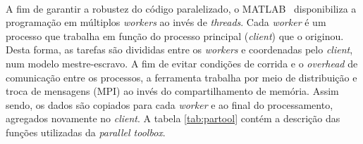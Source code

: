 \documentclass[
    12pt,               %
    openright,          %
    oneside,
    a4paper,            %
    english,            %
    french,             %
    spanish,            %
    brazil              %
    ]{abntex2}
\newcommand{\matlab}{MATLAB\textsuperscript{\textregistered} \ }
\begin{document}
A fim de garantir a robustez do código paralelizado, o \matlab disponibiliza a programação em múltiplos \textit{workers} ao invés de \textit{threads}. Cada \textit{worker} é um processo que trabalha em função do processo principal (\textit{client}) que o originou. Desta forma, as tarefas são divididas entre os \textit{workers} e coordenadas pelo \textit{client}, num modelo mestre-escravo. A fim de evitar condições de corrida e o \textit{overhead} de comunicação entre os processos, a ferramenta trabalha por meio de distribuição e troca de mensagens (MPI) ao invés do compartilhamento de memória. Assim sendo, os dados são copiados para cada \textit{worker} e ao final do processamento, agregados novamente no \textit{client}. A tabela \ref{tab:partool} contém a descrição das funções utilizadas da \textit{parallel toolbox}.
\end{document}
